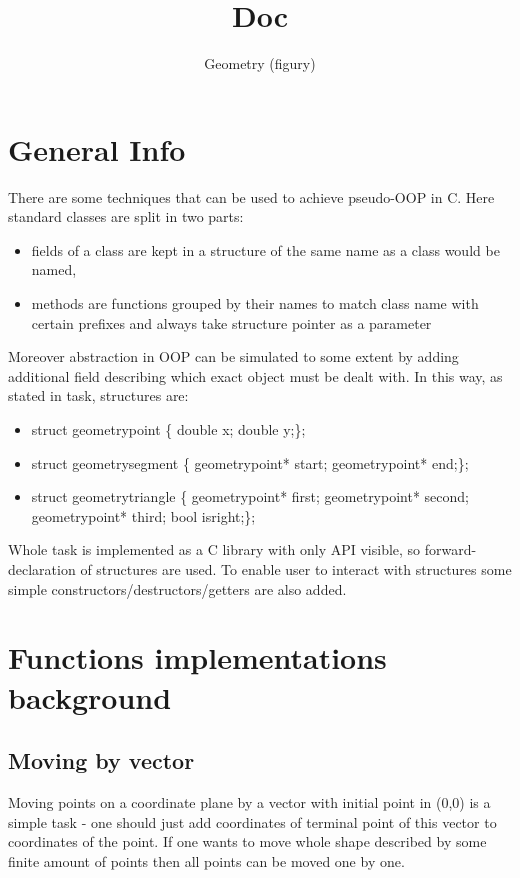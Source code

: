 \documentclass{article}
\title{Doc}
\author{Geometry (figury)}
\date{}
\begin{document}
\maketitle
\section{General Info}
There are some techniques that can be used
to achieve pseudo-OOP in C. Here standard classes are split in two parts:
\begin{itemize}
	\item fields of a class are kept in a structure of the same name as a class would be named,
	\item methods are functions grouped by their names to match class name with certain prefixes and always take structure pointer as a parameter
\end{itemize}  
Moreover abstraction in OOP can be simulated to some extent by adding additional field describing which exact object must be dealt with.
In this way, as stated in task, structures are:
\begin{itemize}
	\item struct geometry\textunderscore point \{ double x; double y;\};
	\item struct geometry\textunderscore segment \{ geometry\textunderscore point* start; geometry\textunderscore point* end;\};
	\item struct geometry\textunderscore triangle \{ geometry\textunderscore point* first; geometry\textunderscore point* second; geometry\textunderscore point* third; bool is\textunderscore right;\};
\end{itemize}
Whole task is implemented as a C library with only API visible, so forward-declaration of structures are used.
To enable user to interact with structures some simple constructors/destructors/getters are also added.

\section{Functions implementations background}
\subsection{Moving by vector}
Moving points on a coordinate plane by a vector with initial point in (0,0) is a simple task - one should just add coordinates of terminal point of this vector to coordinates of the point. If one wants to move whole shape described by some finite amount of points then all points can be moved one by one.
\end{document}
